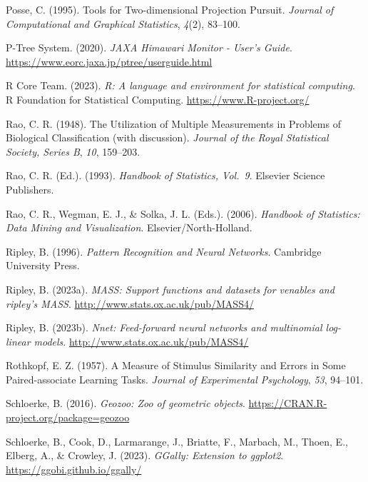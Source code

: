 \documentclass[
  letterpaper,
]{krantz}
\newlength{\cslhangindent}
\newenvironment{CSLReferences}[2] %
 {\begin{list}{}{%
  \setlength{\itemindent}{0pt}
  \setlength{\leftmargin}{0pt}
  \setlength{\parsep}{0pt}
  \ifodd #1
   \setlength{\leftmargin}{\cslhangindent}
   \setlength{\itemindent}{-1\cslhangindent}
  \fi
  \setlength{\itemsep}{#2\baselineskip}}}
 {\end{list}}
\begin{document}
\begin{CSLReferences}{1}{0}
Posse, C. (1995). Tools for {T}wo-dimensional {P}rojection {P}ursuit.
\emph{Journal of Computational and Graphical Statistics}, \emph{4}(2),
83--100.

P-Tree System. (2020). \emph{{JAXA Himawari Monitor - User's Guide}}.
\url{https://www.eorc.jaxa.jp/ptree/userguide.html}

R Core Team. (2023). \emph{R: A language and environment for statistical
computing}. R Foundation for Statistical Computing.
\url{https://www.R-project.org/}

Rao, C. R. (1948). The {U}tilization of {M}ultiple {M}easurements in
{P}roblems of {B}iological {C}lassification (with discussion).
\emph{Journal of the Royal Statistical Society, Series B}, \emph{10},
159--203.

Rao, C. R. (Ed.). (1993). \emph{{H}andbook of {S}tatistics, {V}ol.~9}.
Elsevier Science Publishers.

Rao, C. R., Wegman, E. J., \& Solka, J. L. (Eds.). (2006).
\emph{Handbook of {S}tatistics: {D}ata {M}ining and {V}isualization}.
Elsevier/North-Holland.

Ripley, B. (1996). \emph{Pattern {R}ecognition and {N}eural {N}etworks}.
Cambridge University Press.

Ripley, B. (2023a). \emph{MASS: Support functions and datasets for
venables and ripley's MASS}. \url{http://www.stats.ox.ac.uk/pub/MASS4/}

Ripley, B. (2023b). \emph{Nnet: Feed-forward neural networks and
multinomial log-linear models}.
\url{http://www.stats.ox.ac.uk/pub/MASS4/}

Rothkopf, E. Z. (1957). A {M}easure of {S}timulus {S}imilarity and
{E}rrors in {S}ome {P}aired-associate {L}earning {T}asks. \emph{Journal
of Experimental Psychology}, \emph{53}, 94--101.

Schloerke, B. (2016). \emph{Geozoo: Zoo of geometric objects}.
\url{https://CRAN.R-project.org/package=geozoo}

Schloerke, B., Cook, D., Larmarange, J., Briatte, F., Marbach, M.,
Thoen, E., Elberg, A., \& Crowley, J. (2023). \emph{GGally: Extension to
ggplot2}. \url{https://ggobi.github.io/ggally/}


\end{CSLReferences}
\end{document}
